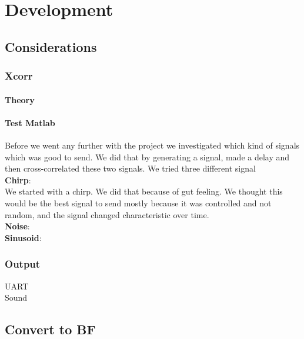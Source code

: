 \chapter{Development}
\section{Considerations}
\subsection{Xcorr}
\subsubsection{Theory}
\subsubsection{Test Matlab}
Before we went any further with the project we investigated which kind of signals which was good to send. We did that by generating a signal, made a delay and then cross-correlated these two signals.
We tried three different signal\\
\textbf{Chirp}:\\
We started with a chirp. We did that because of gut feeling. We thought this would be the best signal to send mostly because it was controlled and not random, and the signal changed characteristic over time.\\

\textbf{Noise}:\\
\textbf{Sinusoid}:\\
\subsection{Output}
UART\\
Sound\\
\section{Convert to BF}
